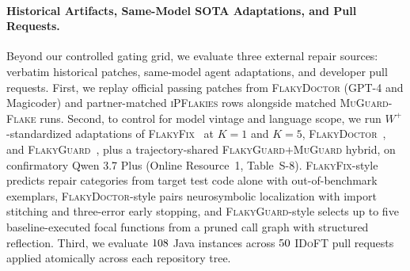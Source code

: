 \paragraph{Historical Artifacts, Same-Model SOTA Adaptations, and Pull Requests.}
Beyond our controlled gating grid, we evaluate three external repair sources: verbatim historical patches, same-model agent adaptations, and developer pull requests. First, we replay official passing patches from \textsc{FlakyDoctor} (GPT-4 and Magicoder) and partner-matched \textsc{iPFlakies} rows alongside matched \textsc{MuGuard-Flake} runs. Second, to control for model vintage and language scope, we run $W^+$-standardized adaptations of \textsc{FlakyFix}~\cite{fatima2024flakyfix} at $K=1$ and $K=5$, \textsc{FlakyDoctor}~\cite{chen2024flakydoctor}, and \textsc{FlakyGuard}~\cite{li2025flakyguard}, plus a trajectory-shared \textsc{FlakyGuard}+\textsc{MuGuard} hybrid, on confirmatory Qwen 3.7 Plus (Online Resource~1, Table~S-8). \textsc{FlakyFix}-style predicts repair categories from target test code alone with out-of-benchmark exemplars, \textsc{FlakyDoctor}-style pairs neurosymbolic localization with import stitching and three-error early stopping, and \textsc{FlakyGuard}-style selects up to five baseline-executed focal functions from a pruned call graph with structured reflection. Third, we evaluate $108$ Java instances across $50$ \textsc{IDoFT} pull requests applied atomically across each repository tree.

